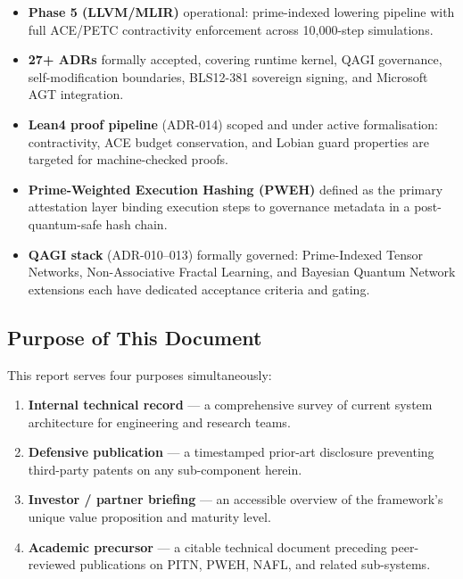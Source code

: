 \documentclass[12pt,a4paper]{article}
\theoremstyle{definition}
\theoremstyle{plain}
\theoremstyle{remark}
\begin{document}
\begin{itemize}
  \item \textbf{Phase 5 (LLVM/MLIR)} operational: prime-indexed lowering pipeline
    with full ACE/PETC contractivity enforcement across 10{,}000-step simulations.
  \item \textbf{27+ ADRs} formally accepted, covering runtime kernel, QAGI
    governance, self-modification boundaries, BLS12-381 sovereign signing,
    and Microsoft AGT integration.
  \item \textbf{Lean4 proof pipeline} (ADR-014) scoped and under active
    formalisation: contractivity, ACE budget conservation, and Lobian guard
    properties are targeted for machine-checked proofs.
  \item \textbf{Prime-Weighted Execution Hashing (PWEH)} defined as the primary
    attestation layer binding execution steps to governance metadata in a
    post-quantum-safe hash chain.
  \item \textbf{QAGI stack} (ADR-010--013) formally governed: Prime-Indexed
    Tensor Networks, Non-Associative Fractal Learning, and Bayesian Quantum
    Network extensions each have dedicated acceptance criteria and gating.
\end{itemize}

\subsection{Purpose of This Document}

This report serves four purposes simultaneously:
\begin{enumerate}
  \item \textbf{Internal technical record} --- a comprehensive survey of current
    system architecture for engineering and research teams.
  \item \textbf{Defensive publication} --- a timestamped prior-art disclosure
    preventing third-party patents on any sub-component herein.
  \item \textbf{Investor / partner briefing} --- an accessible overview of the
    framework's unique value proposition and maturity level.
  \item \textbf{Academic precursor} --- a citable technical document preceding
    peer-reviewed publications on PITN, PWEH, NAFL, and related sub-systems.
\end{enumerate}

\newpage

\end{document}

